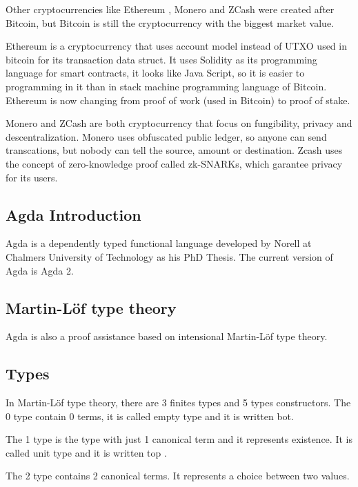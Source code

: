 \documentclass[12pt]{article}
\begin{document}
Other cryptocurrencies like Ethereum \cite{wood2014ethereum}, Monero \cite{noether2015ring} and ZCash \cite{hopwood2016zcash} were created after Bitcoin,
but Bitcoin is still the cryptocurrency with the biggest market value.

Ethereum is a cryptocurrency that uses account model instead of UTXO used in bitcoin for its transaction data struct.
It uses Solidity as its programming language for smart contracts, it looks like Java Script,
so it is easier to programming in it than in stack machine programming language of Bitcoin.
Ethereum is now changing from proof of work (used in Bitcoin) to proof of stake.

Monero and ZCash are both cryptocurrency that focus on fungibility, privacy and descentralization.
Monero uses obfuscated public ledger, so anyone can send transcations, but nobody can tell the source, amount or destination.
Zcash uses the concept of zero-knowledge proof called zk-SNARKs, which garantee privacy for its users.

\subsection{Agda Introduction}
Agda is a dependently typed functional language developed by Norell at Chalmers University of Technology as his PhD Thesis.
The current version of Agda is Agda 2.

  \subsection{Martin-Löf type theory}
  Agda is also a proof assistance based on intensional Martin-Löf type theory.

    \subsection{Types}
    In Martin-Löf type theory, there are 3 finites types and 5 types constructors.
    The 0 type contain 0 terms, it is called empty type and it is written bot.

    The 1 type is the type with just 1 canonical term and it represents existence.
    It is called unit type and it is written top .

    The 2 type contains 2 canonical terms. It represents a choice between two values.
\end{document}
